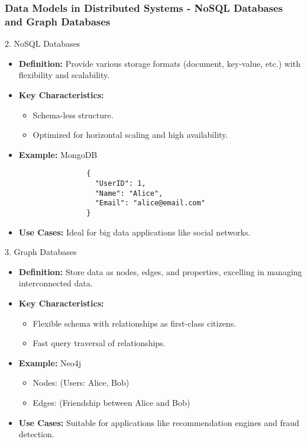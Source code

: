 \documentclass[aspectratio=169]{beamer}
\begin{document}
\begin{frame}[fragile]
    \frametitle{Data Models in Distributed Systems - NoSQL Databases and Graph Databases}
    \begin{block}{2. NoSQL Databases}
        \begin{itemize}
            \item \textbf{Definition:} Provide various storage formats (document, key-value, etc.) with flexibility and scalability.
            \item \textbf{Key Characteristics:}
                \begin{itemize}
                    \item Schema-less structure.
                    \item Optimized for horizontal scaling and high availability.
                \end{itemize}
            \item \textbf{Example:} MongoDB
                \begin{lstlisting}
                {
                  "UserID": 1,
                  "Name": "Alice",
                  "Email": "alice@email.com"
                }
                \end{lstlisting}
            \item \textbf{Use Cases:} Ideal for big data applications like social networks.
        \end{itemize}
    \end{block}
    
    \begin{block}{3. Graph Databases}
        \begin{itemize}
            \item \textbf{Definition:} Store data as nodes, edges, and properties, excelling in managing interconnected data.
            \item \textbf{Key Characteristics:}
                \begin{itemize}
                    \item Flexible schema with relationships as first-class citizens.
                    \item Fast query traversal of relationships.
                \end{itemize}
            \item \textbf{Example:} Neo4j
                \begin{itemize}
                    \item Nodes: (Users: Alice, Bob)
                    \item Edges: (Friendship between Alice and Bob)
                \end{itemize}
            \item \textbf{Use Cases:} Suitable for applications like recommendation engines and fraud detection.
        \end{itemize}
    \end{block}
\end{frame}
\end{document}
